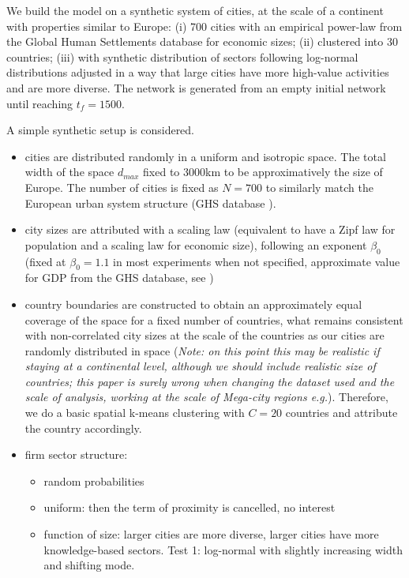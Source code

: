 \documentclass[11pt]{article}
\begin{document}
We build the model on a synthetic system of cities, at the scale of a continent with properties similar to Europe: (i) 700 cities with an empirical power-law from the Global Human Settlements database for economic sizes; (ii) clustered into 30 countries; (iii) with synthetic distribution of sectors following log-normal distributions adjusted in a way that large cities have more high-value activities and are more diverse. The network is generated from an empty initial network until reaching $t_f=1500$.


A simple synthetic setup is considered.
\begin{itemize}
    \item cities are distributed randomly in a uniform and isotropic space. The total width of the space $d_{max}$ fixed to 3000km to be approximatively the size of Europe. The number of cities is fixed as $N=700$ to similarly match the European urban system structure (GHS database \citep{Florczyk2019ghs}).
    \item city sizes are attributed with a scaling law (equivalent to have a Zipf law for population and a scaling law for economic size), following an exponent $\beta_0$ (fixed at $\beta_0 = 1.1$ in most experiments when not specified, approximate value for GDP from the GHS database, see \citep{raimbault:halshs-02284897})
    \item country boundaries are constructed to obtain an approximately equal coverage of the space for a fixed number of countries, what remains consistent with non-correlated city sizes at the scale of the countries as our cities are randomly distributed in space \citep{simini2019testing} (\textit{Note: on this point this may be realistic if staying at a continental level, although we should include realistic size of countries; this paper is surely wrong when changing the dataset used and the scale of analysis, working at the scale of Mega-city regions e.g.}). Therefore, we do a basic spatial k-means clustering with $C = 20$ countries and attribute the country accordingly.
    \item firm sector structure: 
    \begin{itemize}
        \item random probabilities
        \item uniform: then the term of proximity is cancelled, no interest
        \item function of size: larger cities are more diverse, larger cities have more knowledge-based sectors. Test 1: log-normal with slightly increasing width and shifting mode.

\end{itemize}
\end{itemize}
\end{document}
